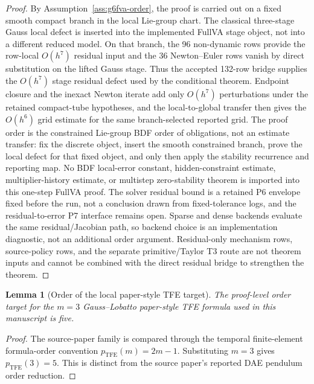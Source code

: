 \documentclass[11pt]{article}
\newtheorem{lemma}{Lemma}
\newcommand{\tfe}{TFE}
\begin{document}
\begin{proof}
By Assumption~\ref{ass:g6fva-order}, the proof is carried out on a fixed
smooth compact branch in the local Lie-group chart.  The classical
three-stage Gauss local defect is inserted into the implemented FullVA stage
object, not into a different reduced model.  On that branch, the 96
non-dynamic rows provide the row-local \(O(h^7)\) residual input and the 36
Newton--Euler rows vanish by direct substitution on the lifted Gauss stage.
Thus the accepted 132-row bridge supplies the \(O(h^7)\) stage residual
defect used by the conditional theorem.  Endpoint closure and the inexact
Newton iterate add only \(O(h^7)\) perturbations under the retained
compact-tube hypotheses, and the local-to-global transfer then gives the
\(O(h^6)\) grid estimate for the same branch-selected reported grid.  The
proof order is the constrained Lie-group BDF order of obligations, not an
estimate transfer: fix the discrete object, insert the smooth constrained
branch, prove the local defect for that fixed object, and only then apply the
stability recurrence and reporting map.  No BDF local-error constant,
hidden-constraint estimate, multiplier-history estimate, or multistep
zero-stability theorem is imported into this one-step FullVA proof.
The solver residual bound is a retained P6 envelope fixed before the run, not a
conclusion drawn from fixed-tolerance logs, and the residual-to-error P7
interface remains open.  Sparse and dense backends evaluate the same
residual/Jacobian path, so backend choice is an implementation diagnostic, not
an additional order argument.  Residual-only mechanism rows, source-policy
rows, and the separate primitive/Taylor T3 route are not theorem inputs and cannot
be combined with the direct residual bridge to strengthen the theorem.
\end{proof}

\begin{lemma}[Order of the local paper-style \tfe{} target]
\label{lem:tfe-target-order}
The proof-level order target for the $m=3$ Gauss--Lobatto paper-style
\tfe{} formula used in this manuscript is five.
\end{lemma}

\begin{proof}
The source-paper family is compared through the temporal finite-element
formula-order convention $p_{\mathrm{TFE}}(m)=2m-1$.  Substituting $m=3$
gives $p_{\mathrm{TFE}}(3)=5$.  This is distinct from the source paper's
reported DAE pendulum order reduction.
\end{proof}
\end{document}
